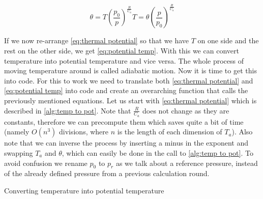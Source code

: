 \begin{subequations}
    \begin{equation}
        \theta = T(\frac{p_0}{p})^{\frac{R}{C_a}}
        \label{eq:thermal potential}
    \end{equation}
    \begin{equation}
        T = \theta(\frac{p}{p_0})^{\frac{R}{C_a}}
        \label{eq:potential temp}
    \end{equation}
\end{subequations}

If we now re-arrange \autoref{eq:thermal potential} so that we have $T$ on one side and the rest on the other side, we get \autoref{eq:potential temp}. With this we can convert temperature into 
potential temperature and vice versa. The whole process of moving temperature around is called adiabatic motion. Now it is time to get this into code. For this to work we need to translate both 
\autoref{eq:thermal potential} and \autoref{eq:potential temp} into code and create an overarching function that calls the previously mentioned equations. Let us start with 
\autoref{eq:thermal potential} which is described in \autoref{alg:temp to pot}. Note that $\frac{R}{C_a}$ does not change as they are constants, therefore we can precompute them which saves quite 
a bit of time (namely $O(n^3)$ divisions, where $n$ is the length of each dimension of $T_a$). Also note that we can inverse the process by inserting a minus in the exponent and swapping $T_a$ 
and $\theta$, which can easily be done in the call to \autoref{alg:temp to pot}. To avoid confusion we rename $p_0$ to $p_r$ as we talk about a reference pressure, instead of the already defined
pressure from a previous calculation round.

\begin{algorithm}
    \Return{$\theta$}
    \caption{Converting temperature into potential temperature}
    \label{alg:temp to pot}
\end{algorithm}

